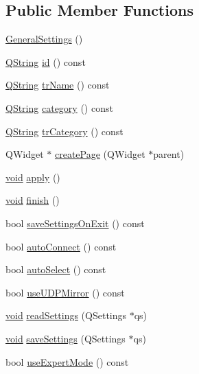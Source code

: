 \subsection*{\-Public \-Member \-Functions}
\begin{DoxyCompactItemize}
\item 
\hyperlink{group___core_plugin_ga7cf4f02d76f5d9db7a232c81277d651d}{\-General\-Settings} ()
\item 
\hyperlink{group___u_a_v_objects_plugin_gab9d252f49c333c94a72f97ce3105a32d}{\-Q\-String} \hyperlink{group___core_plugin_ga8bb51f57d191b5d45c620c51ba0a86ce}{id} () const 
\item 
\hyperlink{group___u_a_v_objects_plugin_gab9d252f49c333c94a72f97ce3105a32d}{\-Q\-String} \hyperlink{group___core_plugin_ga683217bd4278a43c5da4ae02f496e4be}{tr\-Name} () const 
\item 
\hyperlink{group___u_a_v_objects_plugin_gab9d252f49c333c94a72f97ce3105a32d}{\-Q\-String} \hyperlink{group___core_plugin_ga67f6407f4ec5011b0c68ebaf67ebb0d3}{category} () const 
\item 
\hyperlink{group___u_a_v_objects_plugin_gab9d252f49c333c94a72f97ce3105a32d}{\-Q\-String} \hyperlink{group___core_plugin_ga58870a0e7f11e7805de16107c84770aa}{tr\-Category} () const 
\item 
\-Q\-Widget $\ast$ \hyperlink{group___core_plugin_gaeb7677694f5ab09b007ae9e1ac8e42f4}{create\-Page} (\-Q\-Widget $\ast$parent)
\item 
\hyperlink{group___u_a_v_objects_plugin_ga444cf2ff3f0ecbe028adce838d373f5c}{void} \hyperlink{group___core_plugin_gae3a2e41db792dbde563be705654d76ee}{apply} ()
\item 
\hyperlink{group___u_a_v_objects_plugin_ga444cf2ff3f0ecbe028adce838d373f5c}{void} \hyperlink{group___core_plugin_ga784c83abdb7e5367a532ac684bc89c11}{finish} ()
\item 
bool \hyperlink{group___core_plugin_ga045865ac578d53e8a8aca9e8c1e034a8}{save\-Settings\-On\-Exit} () const 
\item 
bool \hyperlink{group___core_plugin_ga5416b64c1586447c9969590a9bd2f0c2}{auto\-Connect} () const 
\item 
bool \hyperlink{group___core_plugin_ga8a3ceff3840ac587a0e118c174fbea7e}{auto\-Select} () const 
\item 
bool \hyperlink{group___core_plugin_ga90989a592d1a849b628a7108bf4ec9ed}{use\-U\-D\-P\-Mirror} () const 
\item 
\hyperlink{group___u_a_v_objects_plugin_ga444cf2ff3f0ecbe028adce838d373f5c}{void} \hyperlink{group___core_plugin_gad9782b056c9573b858d82ce59218a44e}{read\-Settings} (\-Q\-Settings $\ast$qs)
\item 
\hyperlink{group___u_a_v_objects_plugin_ga444cf2ff3f0ecbe028adce838d373f5c}{void} \hyperlink{group___core_plugin_gaa1e79ec44fa23eff837ff6fa6cc50385}{save\-Settings} (\-Q\-Settings $\ast$qs)
\item 
bool \hyperlink{group___core_plugin_ga264b9f5010a2928592a8175416a25f47}{use\-Expert\-Mode} () const 
\end{DoxyCompactItemize}


